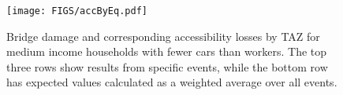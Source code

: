 \begin{figure}[!htb]
    \centering
        \texttt{[image: FIGS/accByEq.pdf]}
    \caption{Bridge damage and corresponding accessibility losses by TAZ for medium income households with fewer cars than workers. The top three rows show results from specific events, while the bottom row has expected values calculated as a weighted average over all events.}
\label{fig:scen_acc}
\end{figure}



